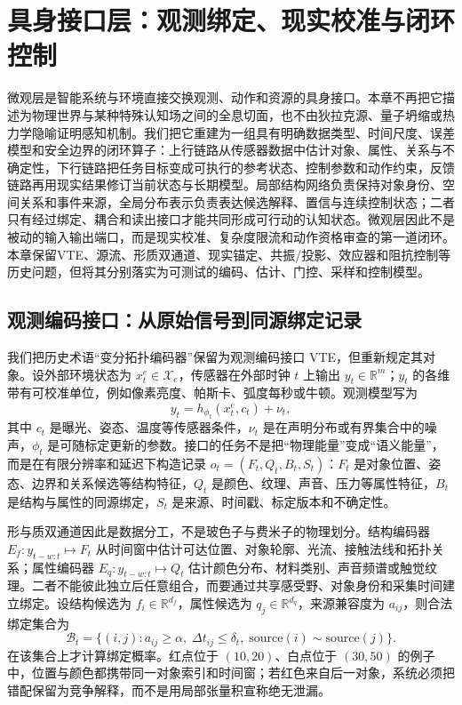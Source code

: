\chapter{具身接口层：观测绑定、现实校准与闭环控制}
\label{chp:microscopic_layer_ch}

微观层是智能系统与环境直接交换观测、动作和资源的具身接口。本章不再把它描述为物理世界与某种特殊认知场之间的全息切面，也不由狄拉克源、量子坍缩或热力学隐喻证明感知机制。我们把它重建为一组具有明确数据类型、时间尺度、误差模型和安全边界的闭环算子：上行链路从传感器数据中估计对象、属性、关系与不确定性，下行链路把任务目标变成可执行的参考状态、控制参数和动作约束，反馈链路再用现实结果修订当前状态与长期模型。局部结构网络负责保持对象身份、空间关系和事件来源，全局分布表示负责表达候选解释、置信与连续控制状态；二者只有经过绑定、耦合和读出接口才能共同形成可行动的认知状态。微观层因此不是被动的输入输出端口，而是现实校准、复杂度限流和动作资格审查的第一道闭环。本章保留VTE、源流、形质双通道、现实锚定、共振/投影、效应器和阻抗控制等历史问题，但将其分别落实为可测试的编码、估计、门控、采样和控制模型。

\section{观测编码接口：从原始信号到同源绑定记录}
\label{sec:vte_as_wave_source}

我们把历史术语“变分拓扑编码器”保留为观测编码接口 VTE，但重新规定其对象。设外部环境状态为 $x_t^{e}\in\mathcal{X}_e$，传感器在外部时钟 $t$ 上输出 $y_t\in\mathbb{R}^{m}$；$y_t$ 的各维带有可校准单位，例如像素亮度、帕斯卡、弧度每秒或牛顿。观测模型写为
\[
y_t=h_{\phi_t}(x_t^{e},c_t)+\nu_t,
\]
其中 $c_t$ 是曝光、姿态、温度等传感器条件，$\nu_t$ 是在声明分布或有界集合中的噪声，$\phi_t$ 是可随标定更新的参数。接口的任务不是把“物理能量”变成“语义能量”，而是在有限分辨率和延迟下构造记录 $o_t=(F_t,Q_t,B_t,S_t)$：$F_t$ 是对象位置、姿态、边界和关系候选等结构特征，$Q_t$ 是颜色、纹理、声音、压力等属性特征，$B_t$ 是结构与属性的同源绑定，$S_t$ 是来源、时间戳、标定版本和不确定性。

形与质双通道因此是数据分工，不是玻色子与费米子的物理划分。结构编码器 $E_f:y_{t-w:t}\mapsto F_t$ 从时间窗中估计可达位置、对象轮廓、光流、接触法线和拓扑关系；属性编码器 $E_q:y_{t-w:t}\mapsto Q_t$ 估计颜色分布、材料类别、声音频谱或触觉纹理。二者不能彼此独立后任意组合，而要通过共享感受野、对象身份和采集时间建立绑定。设结构候选为 $f_i\in\mathbb{R}^{d_f}$，属性候选为 $q_j\in\mathbb{R}^{d_q}$，来源兼容度为 $a_{ij}$，则合法绑定集合为
\[
\mathcal{B}_t=\{(i,j):a_{ij}\geq\alpha,\;\Delta t_{ij}\leq\delta_t,\;\text{source}(i)\sim\text{source}(j)\}.
\]
在该集合上才计算绑定概率。红点位于 $(10,20)$、白点位于 $(30,50)$ 的例子中，位置与颜色都携带同一对象索引和时间窗；若红色来自后一对象，系统必须把错配保留为竞争解释，而不是用局部张量积宣称绝无泄漏。

